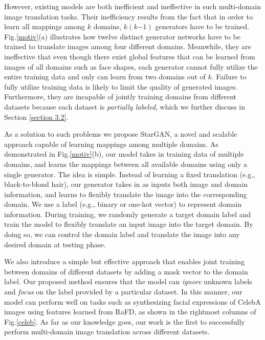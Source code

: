 \documentclass[10pt,twocolumn,letterpaper]{article}
\begin{document}
However, existing models are both inefficient and ineffective in such multi-domain image translation tasks. Their inefficiency results from the fact that in order to learn all mappings among $k$ domains, $k(k\mathbb{-}1)$ generators have to be trained. Fig.\thinspace\ref{motiv}\thinspace(a) illustrates how twelve distinct generator networks have to be trained to translate images among four different domains. Meanwhile, they are ineffective that even though there exist global features that can be learned from images of all domains such as face shapes, each generator cannot fully utilize the entire training data and only can learn from two domains out of $k$. Failure to fully utilize training data is likely to limit the quality of generated images. Furthermore, they are incapable of jointly training domains from different datasets because each dataset is \textit{partially labeled}, which we further discuss in Section \ref{section 3.2}.



As a solution to such problems we propose StarGAN, a novel and scalable approach capable of learning mappings among multiple domains. As demonstrated in Fig.\thinspace\ref{motiv}\thinspace(b), our model takes in training data of multiple domains, and learns the mappings between all available domains using only a single generator. The idea is simple. Instead of learning a fixed translation (e.g., black-to-blond hair), our generator takes in as inputs both image and domain information, and learns to flexibly translate the image into the corresponding domain. We use a label (e.g., binary or one-hot vector) to represent domain information. During training, we randomly generate a target domain label and train the model to flexibly translate an input image into the target domain. By doing so, we can control the domain label and translate the image into any desired domain at testing phase. 

We also introduce a simple but effective approach that enables joint training between domains of different datasets by adding a mask vector to the domain label. Our proposed method ensures that the model can \textit{ignore} unknown labels and \textit{focus} on the label provided by a particular dataset. In this manner, our model can perform well on tasks such as synthesizing facial expressions of CelebA images using features learned from RaFD, as shown in the rightmost columns of Fig.\thinspace\ref{celeb}. As far as our knowledge goes, our work is the first to successfully perform multi-domain image translation across different datasets.
\end{document}

